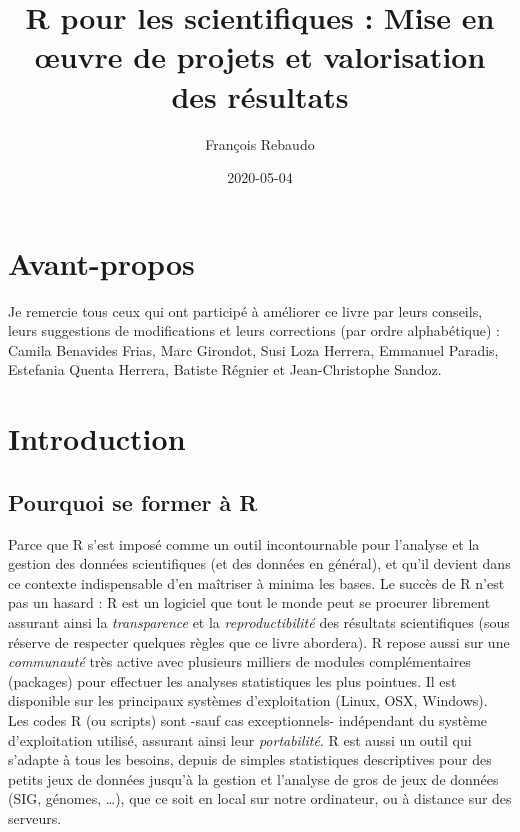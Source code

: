 \documentclass[twoside,symmetric]{book}
\title{R pour les scientifiques : Mise en œuvre de projets et valorisation des résultats}
\author{François Rebaudo}
\date{2020-05-04}
\let\oldmaketitle\maketitle %
\begin{document}
\maketitle


\newpage

\let\maketitle\oldmaketitle
\maketitle

{
\setcounter{tocdepth}{1}
\tableofcontents
}
\hypertarget{avant-propos}{%
\chapter*{Avant-propos}\label{avant-propos}}

Je remercie tous ceux qui ont participé à améliorer ce livre par leurs conseils, leurs suggestions de modifications et leurs corrections (par ordre alphabétique) : Camila Benavides Frias, Marc Girondot, Susi Loza Herrera, Emmanuel Paradis, Estefania Quenta Herrera, Batiste Régnier et Jean-Christophe Sandoz.

\hypertarget{intro}{%
\chapter{Introduction}\label{intro}}

\adjustmtc
\minitoc

\hypertarget{pourquoi-se-former-uxe0-r}{%
\section{Pourquoi se former à R}\label{pourquoi-se-former-uxe0-r}}

Parce que R s'est imposé comme un outil incontournable pour l'analyse et la gestion des données scientifiques (et des données en général), et qu'il devient dans ce contexte indispensable d'en maîtriser à minima les bases. Le succès de R n'est pas un hasard : R est un logiciel que tout le monde peut se procurer librement assurant ainsi la \emph{transparence} et la \emph{reproductibilité} des résultats scientifiques (sous réserve de respecter quelques règles que ce livre abordera). R repose aussi sur une \emph{communauté} très active avec plusieurs milliers de modules complémentaires (packages) pour effectuer les analyses statistiques les plus pointues. Il est disponible sur les principaux systèmes d'exploitation (Linux, OSX, Windows). Les codes R (ou scripts) sont -sauf cas exceptionnels- indépendant du système d'exploitation utilisé, assurant ainsi leur \emph{portabilité}. R est aussi un outil qui s'adapte à tous les besoins, depuis de simples statistiques descriptives pour des petits jeux de données jusqu'à la gestion et l'analyse de gros de jeux de données (SIG, génomes, \ldots{}), que ce soit en local sur notre ordinateur, ou à distance sur des serveurs.
\end{document}
